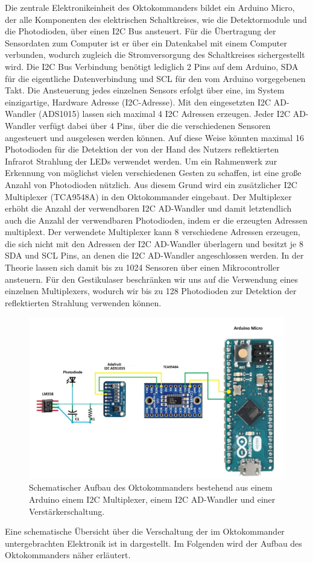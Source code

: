 Die zentrale Elektronikeinheit des Oktokommanders bildet ein Arduino Micro, der alle Komponenten des elektrischen Schaltkreises, wie die Detektormodule und die Photodioden, über einen I2C Bus ansteuert. Für die Übertragung der Sensordaten zum Computer ist er über ein Datenkabel mit einem Computer verbunden, wodurch zugleich die Stromversorgung des Schaltkreises sichergestellt wird. Die I2C Bus Verbindung benötigt lediglich 2 Pins auf dem Arduino, SDA für die eigentliche Datenverbindung und SCL für den vom Arduino vorgegebenen Takt. Die Ansteuerung jedes einzelnen Sensors erfolgt über eine, im System einzigartige, Hardware Adresse (I2C-Adresse). Mit den eingesetzten I2C AD-Wandler (ADS1015) lassen sich maximal 4 I2C Adressen erzeugen. Jeder I2C AD-Wandler verfügt dabei über 4 Pins, über die die verschiedenen Sensoren angesteuert und ausgelesen werden können. Auf diese Weise könnten maximal 16 Photodioden für die Detektion der von der Hand des Nutzers reflektierten Infrarot Strahlung der LEDs verwendet werden. Um ein Rahmenwerk zur Erkennung von möglichst vielen verschiedenen Gesten zu schaffen, ist eine große Anzahl von Photodioden nützlich. Aus diesem Grund wird ein zusätzlicher I2C Multiplexer (TCA9548A) in den Oktokommander eingebaut. Der Multiplexer erhöht die Anzahl der verwendbaren I2C AD-Wandler und damit letztendlich auch die Anzahl der verwendbaren Photodioden, indem er die erzeugten Adressen multiplext. Der verwendete Multiplexer kann 8 verschiedene Adressen erzeugen, die sich nicht mit den Adressen der I2C AD-Wandler überlagern und besitzt je 8 SDA und SCL Pins, an denen die I2C AD-Wandler angeschlossen werden. In der Theorie lassen sich damit bis zu 1024 Sensoren über einen Mikrocontroller ansteuern. Für den Gestikulaser beschränken wir uns auf die Verwendung eines einzelnen Multiplexers, wodurch wir bis zu 128 Photodioden zur Detektion der reflektierten Strahlung verwenden können. 
\begin{figure}[H]
	\centering
	\includegraphics[scale=0.5]{../figures/oktokommander2.jpg}
	\caption{Schematischer Aufbau des Oktokommanders bestehend aus einem Arduino einem I2C Multiplexer, einem I2C AD-Wandler und einer Verstärkerschaltung.}
	\label{fig:SchaltungOktokommander}
\end{figure}
\noindent
Eine schematische Übersicht über die Verschaltung der im Oktokommander untergebrachten Elektronik ist in  dargestellt. Im Folgenden wird der Aufbau des Oktokommanders näher erläutert.


